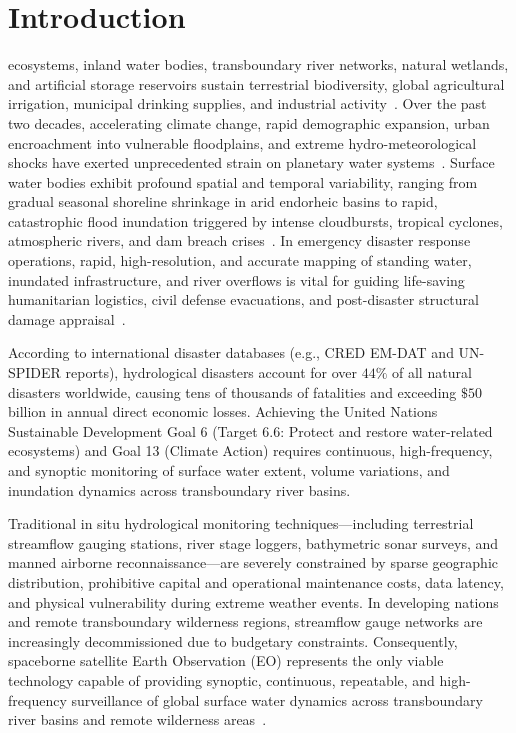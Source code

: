 \section{Introduction}
\label{sec:intro}
 ecosystems, inland water bodies, transboundary river networks, natural wetlands, and artificial storage reservoirs sustain terrestrial biodiversity, global agricultural irrigation, municipal drinking supplies, and industrial activity~\cite{pekel2016high,rahimzadegan2021surface}. Over the past two decades, accelerating climate change, rapid demographic expansion, urban encroachment into vulnerable floodplains, and extreme hydro-meteorological shocks have exerted unprecedented strain on planetary water systems~\cite{taravat2021satellite}. Surface water bodies exhibit profound spatial and temporal variability, ranging from gradual seasonal shoreline shrinkage in arid endorheic basins to rapid, catastrophic flood inundation triggered by intense cloudbursts, tropical cyclones, atmospheric rivers, and dam breach crises~\cite{clement2018multi,boudjit2021sen12flood}. In emergency disaster response operations, rapid, high-resolution, and accurate mapping of standing water, inundated infrastructure, and river overflows is vital for guiding life-saving humanitarian logistics, civil defense evacuations, and post-disaster structural damage appraisal~\cite{brown2022dynamic}.

According to international disaster databases (e.g., CRED EM-DAT and UN-SPIDER reports), hydrological disasters account for over $44\%$ of all natural disasters worldwide, causing tens of thousands of fatalities and exceeding $\$50$ billion in annual direct economic losses. Achieving the United Nations Sustainable Development Goal 6 (Target 6.6: Protect and restore water-related ecosystems) and Goal 13 (Climate Action) requires continuous, high-frequency, and synoptic monitoring of surface water extent, volume variations, and inundation dynamics across transboundary river basins.

Traditional in situ hydrological monitoring techniques---including terrestrial streamflow gauging stations, river stage loggers, bathymetric sonar surveys, and manned airborne reconnaissance---are severely constrained by sparse geographic distribution, prohibitive capital and operational maintenance costs, data latency, and physical vulnerability during extreme weather events. In developing nations and remote transboundary wilderness regions, streamflow gauge networks are increasingly decommissioned due to budgetary constraints. Consequently, spaceborne satellite Earth Observation (EO) represents the only viable technology capable of providing synoptic, continuous, repeatable, and high-frequency surveillance of global surface water dynamics across transboundary river basins and remote wilderness areas~\cite{helber2018eurosat,hong2021spectralformer}.

